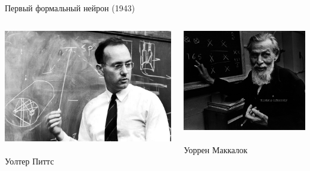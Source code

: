 \documentclass[notes,12pt, aspectratio=169]{beamer}
\begin{document}

\begin{frame}{Первый формальный нейрон (1943)}
\begin{columns}[T] %
	\begin{column}{.48\textwidth}
		\centering \includegraphics[scale=0.2]{pitts.jpg}\\
		\mbox{ } \\
		\color{blue} Уолтер Питтс
	\end{column}%
	\hfill%
	\begin{column}{.48\textwidth}
		\centering \includegraphics[scale=0.23]{makk.jpg}\\
		\mbox{ } \\
		\color{blue}  Уоррен Маккалок
	\end{column}%
\end{columns}
\end{frame}
\end{document}
